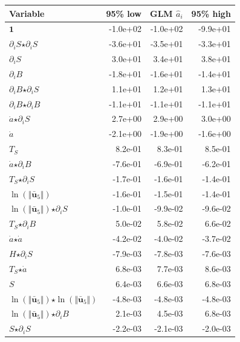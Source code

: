 \begin{table}[H]
\centering
\begin{tabular}{l|r|r|r}
  \textbf{Variable} & \textbf{95\% low} & \textbf{GLM} $\hat{a}_i$ & \textbf{95\% high} \\
  \hline
  $\mathbf{1}$ & -1.0e+02 & -1.0e+02 & -9.9e+01 \\
  $\partial_i S$$ \star $$\partial_i S$ & -3.6e+01 & -3.5e+01 & -3.3e+01 \\
  $\partial_i S$ & 3.0e+01 & 3.4e+01 & 3.8e+01 \\
  $\partial_i B$ & -1.8e+01 & -1.6e+01 & -1.4e+01 \\
  $\partial_i B$$ \star $$\partial_i S$ & 1.1e+01 & 1.2e+01 & 1.3e+01 \\
  $\partial_i B$$ \star $$\partial_i B$ & -1.1e+01 & -1.1e+01 & -1.1e+01 \\
  $\dot{a}$$ \star $$\partial_i S$ & 2.7e+00 & 2.9e+00 & 3.0e+00 \\
  $\dot{a}$ & -2.1e+00 & -1.9e+00 & -1.6e+00 \\
  $T_S$ & 8.2e-01 & 8.3e-01 & 8.5e-01 \\
  $\dot{a}$$ \star $$\partial_i B$ & -7.6e-01 & -6.9e-01 & -6.2e-01 \\
  $T_S$$ \star $$\partial_i S$ & -1.7e-01 & -1.6e-01 & -1.4e-01 \\
  $\ln\left( \Vert \bar{\mathbf{u}}_{5} \Vert \right)$ & -1.6e-01 & -1.5e-01 & -1.4e-01 \\
  $\ln\left( \Vert \bar{\mathbf{u}}_{5} \Vert \right)$$ \star $$\partial_i S$ & -1.0e-01 & -9.9e-02 & -9.6e-02 \\
  $T_S$$ \star $$\partial_i B$ & 5.0e-02 & 5.8e-02 & 6.6e-02 \\
  $\dot{a}$$ \star $$\dot{a}$ & -4.2e-02 & -4.0e-02 & -3.7e-02 \\
  $H$$ \star $$\partial_i S$ & -7.9e-03 & -7.8e-03 & -7.6e-03 \\
  $T_S$$ \star $$\dot{a}$ & 6.8e-03 & 7.7e-03 & 8.6e-03 \\
  $S$ & 6.4e-03 & 6.6e-03 & 6.8e-03 \\
  $\ln\left( \Vert \bar{\mathbf{u}}_{5} \Vert \right)$$ \star $$\ln\left( \Vert \bar{\mathbf{u}}_{5} \Vert \right)$ & -4.8e-03 & -4.8e-03 & -4.8e-03 \\
  $\ln\left( \Vert \bar{\mathbf{u}}_{5} \Vert \right)$$ \star $$\partial_i B$ & 2.1e-03 & 4.5e-03 & 6.8e-03 \\
  $S$$ \star $$\partial_i S$ & -2.2e-03 & -2.1e-03 & -2.0e-03 \\

\end{tabular}
\end{table}
